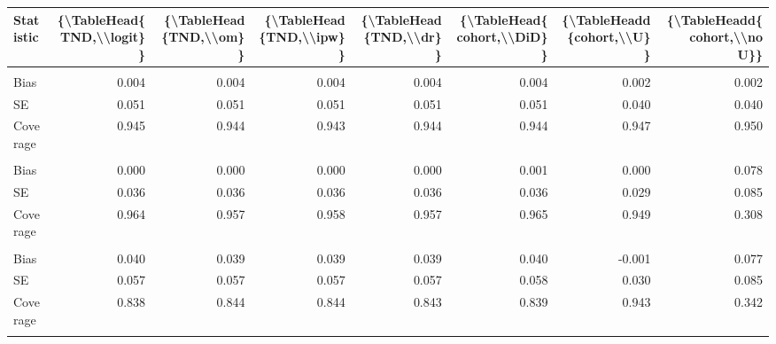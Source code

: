 \begin{table}
\centering
\begin{tabular}{lddddddd}
\toprule
Statistic & \{\textbackslash{}TableHead\{TND,\textbackslash{}\textbackslash{}logit\}\} & \{\textbackslash{}TableHead\{TND,\textbackslash{}\textbackslash{}om\}\} & \{\textbackslash{}TableHead\{TND,\textbackslash{}\textbackslash{}ipw\}\} & \{\textbackslash{}TableHead\{TND,\textbackslash{}\textbackslash{}dr\}\} & \{\textbackslash{}TableHead\{cohort,\textbackslash{}\textbackslash{}DiD\}\} & \{\textbackslash{}TableHeadd\{cohort,\textbackslash{}\textbackslash{}U\}\} & \{\textbackslash{}TableHeadd\{cohort,\textbackslash{}\textbackslash{}no U\}\}\\
\midrule
\addlinespace[0.3em]
\\
\hspace{1em}Bias & 0.004 & 0.004 & 0.004 & 0.004 & 0.004 & 0.002 & 0.002\\
\hspace{1em}SE & 0.051 & 0.051 & 0.051 & 0.051 & 0.051 & 0.040 & 0.040\\
\hspace{1em}Coverage & 0.945 & 0.944 & 0.943 & 0.944 & 0.944 & 0.947 & 0.950\\
\addlinespace[0.3em]
\\
\hspace{1em}Bias & 0.000 & 0.000 & 0.000 & 0.000 & 0.001 & 0.000 & 0.078\\
\hspace{1em}SE & 0.036 & 0.036 & 0.036 & 0.036 & 0.036 & 0.029 & 0.085\\
\hspace{1em}Coverage & 0.964 & 0.957 & 0.958 & 0.957 & 0.965 & 0.949 & 0.308\\
\addlinespace[0.3em]
\\
\hspace{1em}Bias & 0.040 & 0.039 & 0.039 & 0.039 & 0.040 & -0.001 & 0.077\\
\hspace{1em}SE & 0.057 & 0.057 & 0.057 & 0.057 & 0.058 & 0.030 & 0.085\\
\hspace{1em}Coverage & 0.838 & 0.844 & 0.844 & 0.843 & 0.839 & 0.943 & 0.342\\
\addlinespace[0.3em]
\\

\end{tabular}
\end{table}

